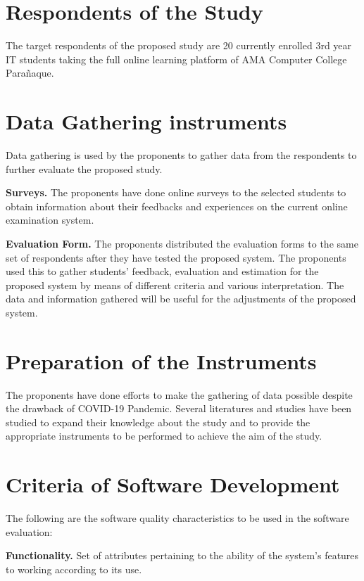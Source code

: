 \section{Respondents of the Study}

The target respondents of the proposed study are 20 currently enrolled 3rd year IT students taking the full online learning platform of AMA Computer College Parañaque.

\section{Data Gathering instruments}

Data gathering is used by the proponents to gather data from the respondents to further evaluate the proposed study.

\textbf{Surveys.}
The proponents have done online surveys to the selected students to obtain information about their feedbacks and experiences on the current online examination system.

\textbf{Evaluation Form.}
The proponents distributed the evaluation forms to the same set of respondents after they have tested the proposed system.
The proponents used this to gather students' feedback, evaluation and estimation for the proposed system by means of different criteria and various interpretation.
The data and information gathered will be useful for the adjustments of the proposed system.

\section{Preparation of the Instruments}

The proponents have done efforts to make the gathering of data possible despite the drawback of COVID-19 Pandemic.
Several literatures and studies have been studied to expand their knowledge about the study and to provide the appropriate instruments to be performed to achieve the aim of the study.

\section{Criteria of Software Development}

The following are the software quality characteristics to be used in the software evaluation:

\textbf{Functionality.}
Set of attributes pertaining to the ability of the system's features to working according to its use.

